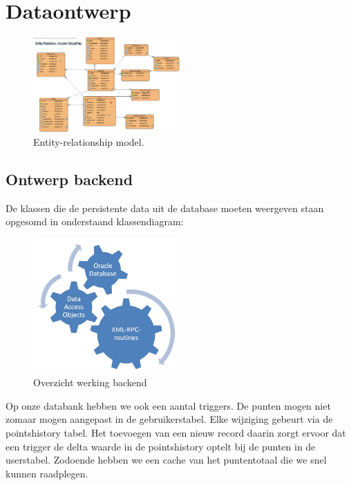 %
%

\chapter{Dataontwerp}

\begin{figure}[h!]
	\centering
		\includegraphics[width=0.5\textwidth]{images/realisatie/ER_Diagram}
	\caption{Entity-relationship model.}
\end{figure}

\section{Ontwerp backend}
De klassen die de persistente data uit de database moeten weergeven staan opgesomd in onderstaand klassendiagram:

\begin{figure}[h!]
	\centering
		\includegraphics[width=0.5\textwidth]{images/realisatie/Class_Diagram}
	\caption{Overzicht werking backend}
\end{figure}

Op onze databank hebben we ook een aantal triggers. De punten mogen niet zomaar mogen aangepast in de gebruikerstabel. Elke wijziging gebeurt via de pointshistory tabel. Het toevoegen van een nieuw record daarin zorgt ervoor dat een trigger de delta waarde in de pointshistory optelt bij de punten in de userstabel. Zodoende hebben we een cache van het puntentotaal die we snel kunnen raadplegen.

